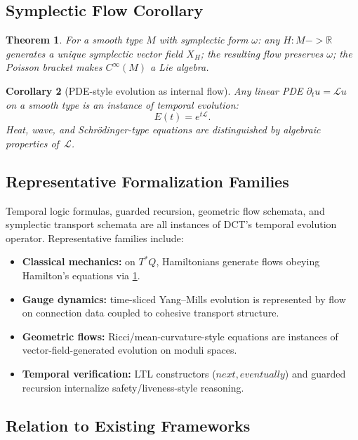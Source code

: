 \documentclass[11pt,a4paper]{article}
\def\to{->}%
\def\bigcirc{next}%
\def\Diamond{eventually}%
\theoremstyle{plain}
\newtheorem{theorem}{Theorem}[section]
\newtheorem{corollary}[theorem]{Corollary}
\theoremstyle{definition}
\theoremstyle{remark}
\newcommand{\R}{\mathbb{R}}
\begin{document}
\subsection{Symplectic Flow Corollary}

\begin{theorem}
\label{thm:symplectic-flow}
For a smooth type $M$ with symplectic form $\omega$:
any $H : M \to \R$ generates a unique symplectic vector field $X_H$;
the resulting flow preserves $\omega$;
the Poisson bracket makes $C^\infty(M)$ a Lie algebra.
\end{theorem}

\begin{corollary}[PDE-style evolution as internal flow]
Any linear PDE $\partial_t u = \mathcal{L}u$ on a smooth type is an instance of temporal evolution:
\[
E(t) = e^{t\mathcal{L}}.
\]
Heat, wave, and Schr\"odinger-type equations are distinguished by algebraic properties of~$\mathcal{L}$.
\end{corollary}

\subsection{Representative Formalization Families}

Temporal logic formulas, guarded recursion, geometric flow schemata, and symplectic transport schemata are all instances of DCT's temporal evolution operator.
Representative families include:
\begin{itemize}[nosep]
    \item \textbf{Classical mechanics:} on $T^*Q$, Hamiltonians generate flows obeying Hamilton's equations via \cref{thm:symplectic-flow}.
    \item \textbf{Gauge dynamics:} time-sliced Yang--Mills evolution is represented by flow on connection data coupled to cohesive transport structure.
    \item \textbf{Geometric flows:} Ricci/mean-curvature-style equations are instances of vector-field-generated evolution on moduli spaces.
    \item \textbf{Temporal verification:} LTL constructors ($\bigcirc,\Diamond$) and guarded recursion internalize safety/liveness-style reasoning.
\end{itemize}

\subsection{Relation to Existing Frameworks}
\end{document}
